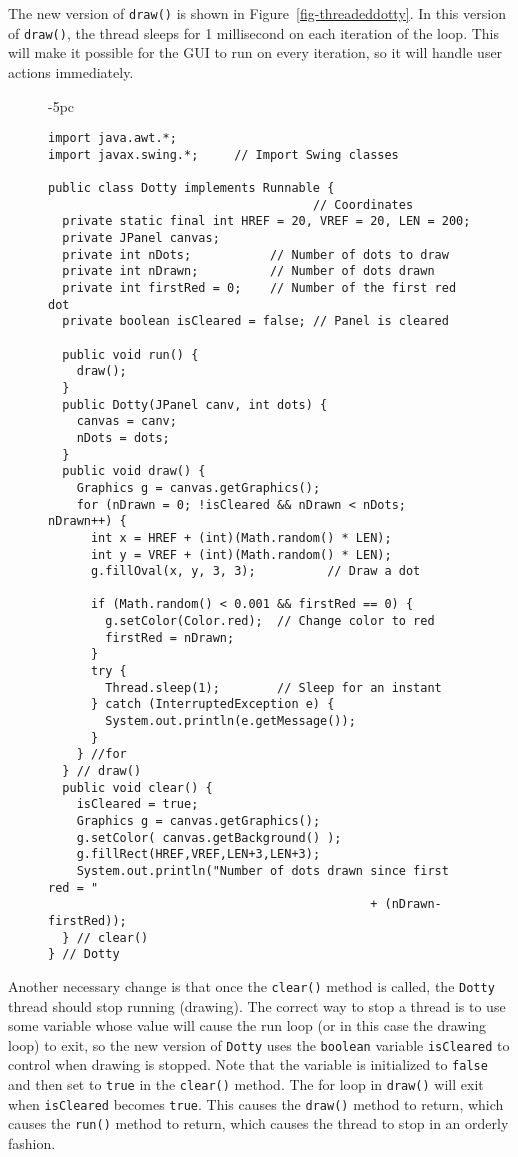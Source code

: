 The new version of {\tt draw()} is shown in
Figure~\ref{fig-threadeddotty}.  In this version of {\tt draw()}, the
thread sleeps for 1 millisecond on each iteration of the loop.  This
will make it possible for the GUI to run on every iteration, so it
will handle user actions immediately.

\begin{figure}[p]
\jjjprogstart
\begin{jjjlistingleft}[31pc]{-5pc}
\begin{lstlisting}
import java.awt.*;
import javax.swing.*;     // Import Swing classes

public class Dotty implements Runnable {
                                     // Coordinates
  private static final int HREF = 20, VREF = 20, LEN = 200; 
  private JPanel canvas;
  private int nDots;           // Number of dots to draw
  private int nDrawn;          // Number of dots drawn
  private int firstRed = 0;    // Number of the first red dot
  private boolean isCleared = false; // Panel is cleared

  public void run() {
    draw();
  }
  public Dotty(JPanel canv, int dots) {
    canvas = canv;
    nDots = dots;
  }
  public void draw() {
    Graphics g = canvas.getGraphics();
    for (nDrawn = 0; !isCleared && nDrawn < nDots; nDrawn++) {
      int x = HREF + (int)(Math.random() * LEN);
      int y = VREF + (int)(Math.random() * LEN);
      g.fillOval(x, y, 3, 3);          // Draw a dot

      if (Math.random() < 0.001 && firstRed == 0) {
        g.setColor(Color.red);  // Change color to red
        firstRed = nDrawn;
      }
      try {
        Thread.sleep(1);        // Sleep for an instant
      } catch (InterruptedException e) {
        System.out.println(e.getMessage());
      }
    } //for
  } // draw()
  public void clear() {
    isCleared = true;
    Graphics g = canvas.getGraphics();
    g.setColor( canvas.getBackground() );
    g.fillRect(HREF,VREF,LEN+3,LEN+3);
    System.out.println("Number of dots drawn since first red = "
                                             + (nDrawn-firstRed));
  } // clear()
} // Dotty
\end{lstlisting}
\end{jjjlistingleft}
\end{figure}

Another necessary change is that once the {\tt clear()} method is
called, the {\tt Dotty} thread should stop running (drawing). The
correct way to stop a thread is to use some variable whose value will
cause the run loop (or in this case the drawing loop) to exit, so the
new version of {\tt Dotty} uses the {\tt boolean} variable
{\tt isCleared} to control when drawing is stopped.  Note that the variable
is initialized to {\tt false} and then set to {\tt true} in the
{\tt clear()} method.  The for loop in {\tt draw()} will exit when
{\tt isCleared} becomes {\tt true}. This causes the {\tt draw()} method
to return, which causes the {\tt run()} method to return, which
causes the thread to stop in an orderly fashion.

